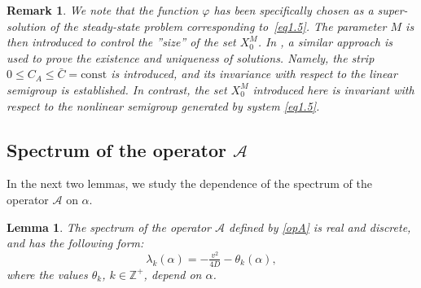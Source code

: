 \documentclass{mpi2015-cscpreprint}
\newtheorem{lemma}[theorem]{Lemma}
\newtheorem{remark}{Remark}[section]
\numberwithin{equation}{section}
\begin{document}
\begin{remark}\label{rem:invariance}
{ We note that the function $\varphi$ has been specifically chosen as a super-solution of the steady-state problem corresponding to~\eqref{eq1.5}. The parameter $M$ is then introduced to control the ''size'' of the set $X_0^M$.} In \cite{AylAchLaa2007}, a similar approach is used to prove the existence and uniqueness of solutions. Namely, the strip $0\le C_A \le \bar{C}=\mathrm{const}$ is introduced, and its invariance with respect to the linear semigroup is established. In contrast, the set $X_0^M$ introduced here is invariant with respect to the nonlinear semigroup generated by system \eqref{eq1.5}.
\end{remark}


\subsection{Spectrum of the operator $\mathcal{A}$}\label{sec:operator_A}

In the next two lemmas, we study the dependence of the spectrum of the operator $\mathcal{A}$ on $\alpha$.

\begin{lemma}\label{lem:spectrum_of_A}
The spectrum of the operator $\mathcal{A}$ defined by \eqref{opA} is real and discrete, and has the following form:
\begin{equation}\label{eq:eigenvalues}
\lambda_k(\alpha) = -\tfrac{v^2}{4D} - \theta_k(\alpha),
\end{equation}
where the values $\theta_k$, $k\in\mathbb{Z}^+$, depend on $\alpha$.
\end{lemma}
\end{document}
